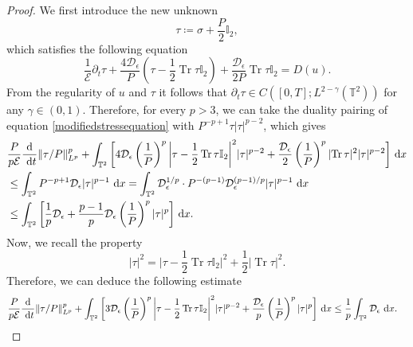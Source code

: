 \documentclass[12pt,a4paper]{article}
\theoremstyle{definition}
\theoremstyle{remark}
\numberwithin{equation}{section}
\newcommand{\dx}{\ {\rm d} {x}}
\newcommand{\dt}{\ {\rm d} t }
\DeclareMathOperator{\Tr}{Tr}
\begin{document}
\begin{proof}
We first introduce the new unknown
\begin{equation} \label{newunkown}
\tau \coloneqq \sigma + \frac{P}{2} \mathbb I_2,
\end{equation}
which satisfies the following equation
\begin{equation} \label{modifiedstressequation}
\dfrac{1}{\mathcal E} \partial_t \tau + \dfrac{4 \mathcal{D}_\epsilon}{P} (\tau - \frac{1}{2} \Tr \tau \mathbb I_2) + \dfrac{\mathcal{D}_\epsilon}{2P} \Tr \tau \mathbb I_2 = D(u).
\end{equation}
From the regularity of $u$ and $\tau$ it follows that $\partial_t \tau \in C([0,T]; L^{2 - \gamma} (\mathbb{T}^2))$ for any $\gamma \in (0,1)$. Therefore, for every $p > 3$, we can take the duality pairing of equation \eqref{modifiedstressequation} with $P^{-p+1} \tau \lvert \tau \rvert^{p-2}$, which gives
\begin{align*}
&\frac{P}{p \mathcal{E}} \frac{\textrm{d}}{\dt} \lVert \tau / P \rVert_{L^p}^p + \int_{\mathbb{T}^2} \bigg[ 4 \mathcal{D}_\epsilon \left( \frac{1}{P} \right)^p \bigg\lvert \tau - \frac{1}{2} \Tr \tau \mathbb I_2 \bigg\rvert^2 \lvert \tau \rvert^{p-2} + \dfrac{\mathcal{D}_\epsilon}{2} \left( \frac{1}{P} \right)^p \lvert \Tr \tau \rvert^2 \lvert \tau \rvert^{p-2} \bigg] \dx \\
&\leq \int_{\mathbb{T}^2} P^{-p+1} \mathcal{D}_\epsilon \lvert \tau \rvert^{p-1} \dx = \int_{\mathbb{T}^2} \mathcal{D}_\epsilon^{1/p} \cdot P^{-(p-1)} \mathcal{D}_\epsilon^{(p-1)/p} \lvert \tau \rvert^{p-1} \dx \\
&\leq \int_{\mathbb{T}^2} \bigg[\frac{1}{p} \mathcal{D}_\epsilon + \frac{p-1}{p} \mathcal{D}_\epsilon \left( \frac{1}{P} \right)^p \lvert \tau \rvert^p \bigg] \dx.
\end{align*}
Now, we recall the property
\begin{equation*}
\lvert \tau \rvert^2 = \bigg\lvert \tau - \frac{1}{2} \Tr \tau \mathbb I_2 \bigg\rvert^2 + \frac{1}{2} \lvert \Tr \tau \rvert^2.
\end{equation*}
Therefore, we can deduce the following estimate
\begin{align*}
\frac{P}{p \mathcal{E}} \frac{\textrm{d}}{\dt} \lVert \tau / P \rVert_{L^p}^p &+ \int_{\mathbb{T}^2} \bigg[ 3 \mathcal{D}_\epsilon \left( \frac{1}{P} \right)^p \bigg\lvert \tau - \frac{1}{2} \Tr \tau \mathbb I_2 \bigg\rvert^2 \lvert \tau \rvert^{p-2} + \dfrac{\mathcal{D}_\epsilon}{p} \left( \frac{1}{P} \right)^p \lvert \tau \rvert^p \bigg] \dx \leq \frac{1}{p} \int_{\mathbb{T}^2} \mathcal{D}_\epsilon \dx.

\end{align*}
\end{proof}
\end{document}
